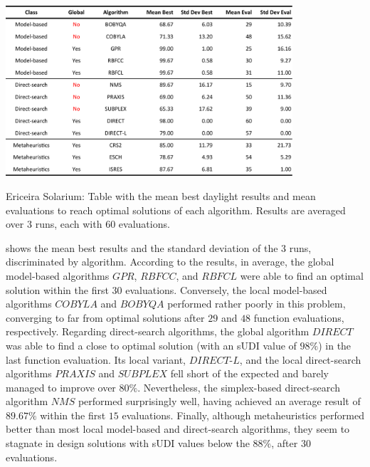 \begin{table}[htbp]
	\centering
	\includegraphics[width=0.8\textwidth]{tables_and_code/Ericeira_phase1_stats_v1.pdf}
	\caption[Ericeira Solarium: Mean best results and evaluations discriminated per algorithm]{Ericeira Solarium: Table with the mean best daylight results and mean evaluations to reach optimal solutions of each algorithm. Results are averaged over $3$ runs, each with $60$ evaluations.}
	\label{table:phase1results}
\end{table}

 shows the mean best results and the standard deviation of the $3$ runs,  discriminated by algorithm. According to the results, in average, the global model-based algorithms $GPR$, $RBFCC$, and $RBFCL$ were able to find an optimal solution within the first $30$ evaluations. Conversely, the local model-based algorithms $COBYLA$ and $BOBYQA$ performed rather poorly in this problem, converging to far from optimal solutions after $29$ and $48$ function evaluations, respectively. Regarding direct-search algorithms, the global algorithm $DIRECT$ was able to find a close to optimal solution (with an \ac{sUDI} value of $98\%$) in the last function evaluation. Its local variant, $DIRECT$-$L$, and the local direct-search algorithms $PRAXIS$ and $SUBPLEX$ fell short of the expected and barely managed to improve over $80\%$. Nevertheless, the simplex-based direct-search algorithm $NMS$ performed surprisingly well, having achieved an average result of $89.67\%$ within the first $15$ evaluations. Finally, although metaheuristics performed better than most local model-based and direct-search algorithms, they seem to stagnate in design solutions with \ac{sUDI} values below the $88\%$, after $30$ evaluations.

